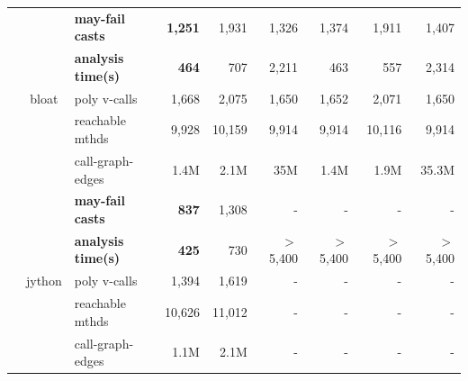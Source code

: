 \begin{table}[]
\begin{tabular}{|c| c | l |r| r r  || r | r  r |}
&\multirow{5}{*}{bloat}
                          & \textbf{may-fail casts} & \textbf{1,251}            & 1,931        & 1,326    &1,374 &1,911 & 1,407     \\
&                          & \textbf{analysis time(s)} & \textbf{464}               & 707         & 2,211   &463 &557 & 2,314     \\
&                          & poly v-calls     & 1,668           & 2,075       & 1,650   &1,652 &2,071 & 1,650     \\
&                          & reachable mthds  &9,928      & 10,159     & 9,914  &9,914 &10,116 & 9,914     \\
&                          & call-graph-edges  & 1.4M    & 2.1M      & 35M  &1.4M &1.9M & 35.3M     \\ \cline{2-9}

&\multirow{5}{*}{jython}
                          & \textbf{may-fail casts} & \textbf{837}       & 1,308 &-         &-         &-         &-       \\
&                          & \textbf{analysis time(s)} & \textbf{425}    & 730   &$>$5,400  &$>$5,400  &$>$5,400  &$>$5,400       \\
&                          & poly v-calls           & 1,394          & 1,619     &-         &-         &-         &-       \\
&                          & reachable mthds        & 10,626        & 11,012     &-         &-         &-         &-      \\
&                          & call-graph-edges       & 1.1M            & 2.1M       &-         &-         &-         &-      \\ \cline{1-9}

\end{tabular}
\end{table}


